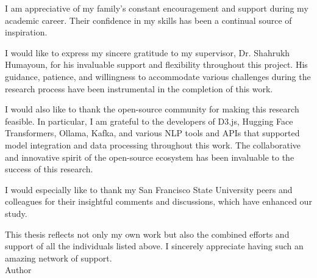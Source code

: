 \documentclass[
12pt, 
english,
onehalfspacing,
headsepline,
]{MastersDoctoralThesis}
\begin{document}
\begin{singlespacing}

\begin{acknowledgements}
\addchaptertocentry{\acknowledgementname}

\setlength{\parskip}{10pt plus 1pt minus 1pt}

I am appreciative of my family's constant encouragement and support during my academic career. Their confidence in my skills has been a continual source of inspiration.

I would like to express my sincere gratitude to my supervisor, Dr. Shahrukh Humayoun, for his invaluable support and flexibility throughout this project. His guidance, patience, and willingness to accommodate various challenges during the research process have been instrumental in the completion of this work.

I would also like to thank the open-source community for making this research feasible. In particular, I am grateful to the developers of D3.js, Hugging Face Transformers, Ollama, Kafka, and various NLP tools and APIs that supported model integration and data processing throughout this work. The collaborative and innovative spirit of the open-source ecosystem has been invaluable to the success of this research.

I would especially like to thank my San Francisco State University peers and colleagues for their insightful comments and discussions, which have enhanced our study.

This thesis reflects not only my own work but also the combined efforts and support of all the individuals listed above. I sincerely appreciate having such an amazing network of support.\\[2cm]

\noindent
Author\\
\authorname

\end{acknowledgements}

\newpage

\end{singlespacing}

\end{document}
